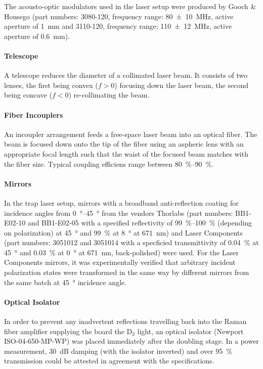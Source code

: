 The acousto-optic modulators used in the laser setup were produced by Gooch \& Housego (part numbers: 3080-120, frequency range: \SI{80(10)}{\mega\hertz}, active aperture of \SI{1}{\milli\meter} and 3110-120, frequency range: \SI{110(12)}{\mega\hertz}, active aperture of \SI{0.6}{\milli\meter}).

\paragraph{Telescope} A telescope reduces the diameter of a collimated laser beam. It consists of two lenses, the first being convex ($f > 0$) focusing down the laser beam, the second being concave ($f < 0$) re-collimating the beam.
    
\paragraph{Fiber Incouplers} An incoupler arrangement feeds a free-space laser beam into an optical fiber. The beam is focused down onto the tip of the fiber using an aspheric lens with an appropriate focal length such that the waist of the focused beam matches with the fiber size. Typical coupling efficiens range between \SIrange[]{80}{90}{\percent}.
    
\paragraph{Mirrors}
In the trap laser setup, mirrors with a broadband anti-reflection coating for incidence angles from \SIrange[]{0}{45}{\degree} from the vendors Thorlabs (part numbers: BB1-E02-10 and BB1-E02-05 with a specified reflectivity of \SIrange[]{99}{100}{\percent} (depending on polarization) at \SI[]{45}{\degree} and \SI[]{99}{\percent} at \SI[]{8}{\degree} at \SI[]{671}{\nano\meter}) and Laser Components (part numbers: 3051012 and 3051014 with a specficied transmittivity of \SI[]{0.04}{\percent} at \SI[]{45}{\degree} and \SI[]{0.03}{\percent} at \SI[]{0}{\degree} at \SI[]{671}{\nano\meter}, back-polished) were used. For the Laser Components mirrors, it was experimentally verified that arbitrary incident polarization states were transformed in the same way by different mirrors from the same batch at \SI[]{45}{\degree} incidence angle.

\paragraph{Optical Isolator}
In order to prevent any inadvertent reflections travelling back into the Raman fiber amplifier supplying the board the D$_2$ light, an optical isolator (Newport ISO-04-650-MP-WP) was placed immediately after the doubling stage. In a power measurement, \SI{30}{\deci\bel} damping (with the isolator inverted) and over \SI{95}{\percent} transmission could be attested in agreement with the specifications.

